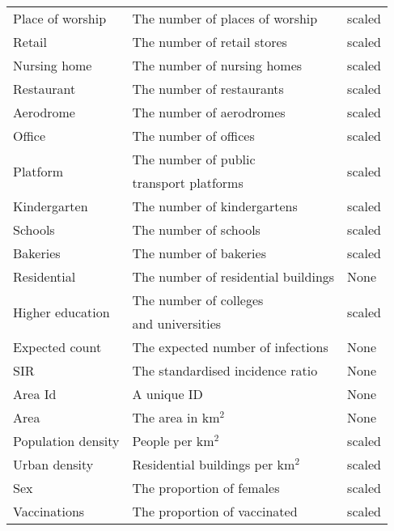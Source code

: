 \begin{table}[H]
\begin{tabular}{l l l}
Place of worship & The number of places of worship & scaled \\
Retail & The number of retail stores & scaled \\
Nursing home & The number of nursing homes & scaled \\
Restaurant & The number of restaurants & scaled \\
Aerodrome & The number of aerodromes & scaled \\
Office & The number of offices & scaled \\
\multirow{2}{*}{Platform} & The number of public & \multirow{2}{*}{scaled} \\
& transport platforms \\
Kindergarten & The number of kindergartens & scaled \\
Schools & The number of schools & scaled \\
Bakeries & The number of bakeries & scaled \\
Residential & The number of residential buildings & None \\
\multirow{2}{*}{Higher education} & The number of colleges & \multirow{2}{*}{scaled} \\
& and universities \\
Expected count & The expected number of infections & None \\
SIR & The standardised incidence ratio & None \\
Area Id & A unique ID & None \\
Area & The area in km$^2$ & None \\
Population density & People per km$^2$ & scaled\\
\multirow{1}{*}{Urban density} &  Residential buildings per km$^2$ & scaled \\
Sex & The proportion of females & scaled \\
Vaccinations & The proportion of vaccinated & scaled \\
\bottomrule
\end{tabular}
\end{table}
